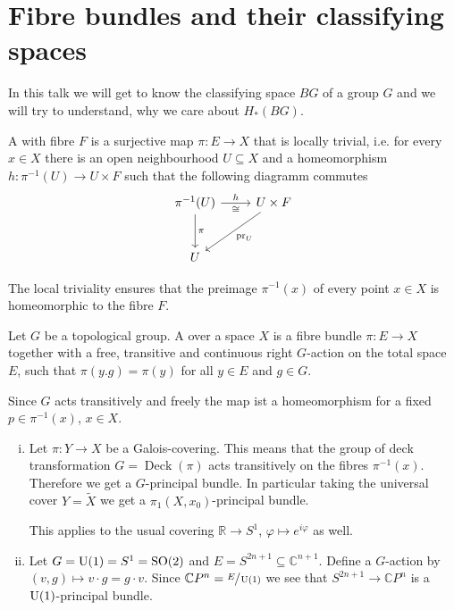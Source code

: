 \section{Fibre bundles and their classifying spaces}
In this talk we will get to know the classifying space $BG$ of a group $G$ and we will try to understand, why we care about $H_*(BG)$.

\begin{definition}
	A  with fibre $F$ is a surjective map $\pi \colon E \to X$ that is locally trivial, i.e. for every $x \in X$ there is an open neighbourhood $U \subseteq X$ and a homeomorphism $h \colon \pi^{-1}(U) \to U \times F$ such that the following diagramm commutes
	\[
		\begin{tikzcd}[row sep=large]
			\pi^{-1}(U) \rar["h","\cong"'] \dar["\pi"] & U \times F \dlar["\pr_U"] \\
			U
		\end{tikzcd}
	\]
\end{definition}

The local triviality ensures that the preimage $\pi^{-1}(x)$ of every point $x \in X$ is homeomorphic to the fibre $F$.

\begin{definition}
	Let $G$ be a topological group.
	A  over a space $X$ is a fibre bundle $\pi \colon E \to X$ together with a free, transitive and continuous right $G$-action on the total space $E$, such that $\pi(y.g) = \pi(y)$ for all $y \in E$ and $g \in G$.
\end{definition}

\begin{remark}
	Since $G$ acts transitively and freely the map 
	ist a homeomorphism for a fixed $p \in \pi^{-1}(x)$, $x \in X$.
\end{remark}

\begin{example}
	\begin{enumerate}[(i)]
		\item Let $\pi \colon Y \to X$ be a Galois-covering.
		This means that the group of deck transformation $G=\operatorname{Deck}(\pi)$ acts transitively on the fibres $\pi^{-1}(x)$.
		Therefore we get a $G$-principal bundle.
		In particular taking the universal cover $Y= \tilde{X}$ we get a $\pi_1(X,x_0)$-principal bundle.
		
		This applies to the usual covering $\mathbb{R} \to S^1$, $\varphi \mapsto e^{i \varphi}$ as well.
		\item Let $G= \operatorname{U}(1) =S^1 = \operatorname{SO}(2)$ and $E = S^{2n+1} \subseteq \mathbb{C}^{n+1}$.
		Define a $G$-action by $(v,g) \mapsto v \cdot g = g \cdot v$.
		Since $\mathbb{C}P^n = \sfrac{E}{\operatorname{U}(1)}$ we see that $S^{2n+1} \to \mathbb{C}P^n$ is a $\operatorname{U}(1)$-principal bundle.
	\end{enumerate}
\end{example}